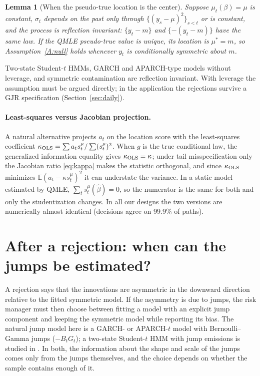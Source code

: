 \documentclass[11pt,a4paper]{article}
\newtheorem{lemma}{Lemma}
\theoremstyle{definition}
\theoremstyle{remark}
\newcommand{\E}{\mathbb{E}}
\begin{document}
\begin{lemma}[When the pseudo-true location is the center]\label{lem:pseudo}
Suppose $\mu_t(\beta)=\mu$ is constant, $\sigma_t$ depends on the past only through $\{(y_s-\mu)^2\}_{s<t}$ or is constant, and the process is reflection invariant: $\{y_t-m\}$ and $\{-(y_t-m)\}$ have the same law. If the QMLE pseudo-true value is unique, its location is $\mu^*=m$, so Assumption~\ref{A:null} holds whenever $y_t$ is conditionally symmetric about $m$.
\end{lemma}

\noindent Two-state Student-$t$ HMMs, GARCH and APARCH-type models without leverage, and symmetric contamination are reflection invariant. With leverage the assumption must be argued directly; in the application the rejections survive a GJR specification (Section~\ref{sec:daily}).

\paragraph{Least-squares versus Jacobian projection.} A natural alternative projects $a_t$ on the location score with the least-squares coefficient $\kappa_{\rm OLS}=\sum a_ts^\mu_t/\sum(s^\mu_t)^2$. When $g$ is the true conditional law, the generalized information equality gives $\kappa_{\rm OLS}=\kappa$; under tail misspecification only the Jacobian ratio \eqref{eq:kappa} makes the statistic orthogonal, and since $\kappa_{\rm OLS}$ minimizes $\E(a_t-\kappa s^\mu_t)^2$ it can understate the variance. In a static model estimated by QMLE, $\sum_ts^\mu_t(\hat\beta)=0$, so the numerator is the same for both and only the studentization changes. In all our designs the two versions are numerically almost identical (decisions agree on 99.9\% of paths).

\section{After a rejection: when can the jumps be estimated?}\label{sec:after}
A rejection says that the innovations are asymmetric in the downward direction relative to the fitted symmetric model. If the asymmetry is due to jumps, the risk manager must then choose between fitting a model with an explicit jump component and keeping the symmetric model while reporting its bias. The natural jump model here is a GARCH- or APARCH-$t$ model with Bernoulli--Gamma jumps ($-B_tG_t$); a two-state Student-$t$ HMM with jump emissions is studied in \citet{giornoB}. In both, the information about the shape and scale of the jumps comes only from the jumps themselves, and the choice depends on whether the sample contains enough of it.
\end{document}
